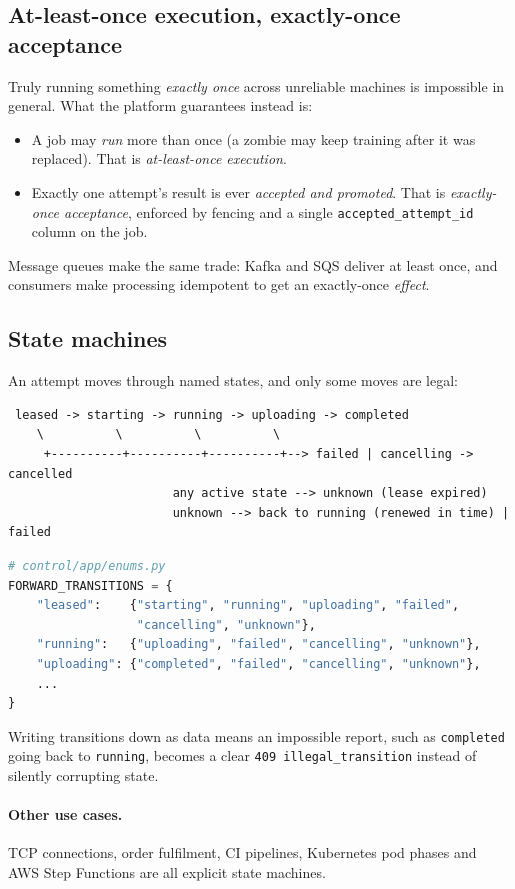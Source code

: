 \subsection{At-least-once execution, exactly-once acceptance}

Truly running something \emph{exactly once} across unreliable machines is
impossible in general. What the platform guarantees instead is:

\begin{itemize}
\item A job may \emph{run} more than once (a zombie may keep training after it
  was replaced). That is \emph{at-least-once execution}.
\item Exactly one attempt's result is ever \emph{accepted and promoted}. That
  is \emph{exactly-once acceptance}, enforced by fencing and a single
  \texttt{accepted\_attempt\_id} column on the job.
\end{itemize}

Message queues make the same trade: Kafka and SQS deliver at least once, and
consumers make processing idempotent to get an exactly-once \emph{effect}.

\subsection{State machines}

An attempt moves through named states, and only some moves are legal:

\begin{verbatim}
 leased -> starting -> running -> uploading -> completed
    \          \          \          \
     +----------+----------+----------+--> failed | cancelling -> cancelled
                       any active state --> unknown (lease expired)
                       unknown --> back to running (renewed in time) | failed
\end{verbatim}

\begin{lstlisting}[language=Python]
# control/app/enums.py
FORWARD_TRANSITIONS = {
    "leased":    {"starting", "running", "uploading", "failed",
                  "cancelling", "unknown"},
    "running":   {"uploading", "failed", "cancelling", "unknown"},
    "uploading": {"completed", "failed", "cancelling", "unknown"},
    ...
}
\end{lstlisting}

Writing transitions down as data means an impossible report, such as
\texttt{completed} going back to \texttt{running}, becomes a clear
\texttt{409 illegal\_transition} instead of silently corrupting state.

\paragraph{Other use cases.} TCP connections, order fulfilment, CI pipelines,
Kubernetes pod phases and AWS Step Functions are all explicit state machines.
